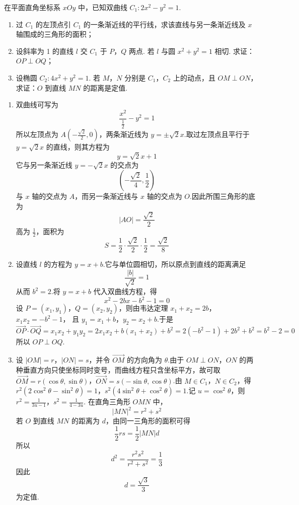 \begin{problem}
在平面直角坐标系 \(xOy\) 中，已知双曲线 \(C_1: 2x^2 - y^2 = 1\).

\begin{enumerate}
\item 过 \(C_{1}\) 的左顶点引 \(C_{1}\) 的一条渐近线的平行线，求该直线与另一条渐近线及 \(x\) 轴围成的三角形的面积；
\item 设斜率为 1 的直线 \(l\) 交 \(C_{1}\) 于 \(P\)，\(Q\) 两点. 若 \(l\) 与圆 \(x^{2} + y^{2} = 1\) 相切. 求证： \(OP \perp OQ\)；
\item 设椭圆 \(C_{2}: 4x^{2} + y^{2} = 1\). 若 \(M\)，\(N\) 分别是 \(C_{1}\)，\(C_{2}\) 上的动点，且 \(OM \perp ON\)，求证：\(O\) 到直线 \(MN\) 的距离是定值.
\end{enumerate}
\end{problem}

\begin{solution}
\begin{enumerate}
\item 双曲线可写为
\[
\frac{x^2}{\frac{1}{2}}-y^2=1
\]
所以左顶点为 \(A\left(-\frac{\sqrt2}{2},0\right)\)，两条渐近线为 \(y=\pm\sqrt2x\).取过左顶点且平行于 \(y=\sqrt2x\) 的直线，则其方程为
\[
y=\sqrt2x+1
\]
它与另一条渐近线 \(y=-\sqrt2x\) 的交点为
\[
\left(-\frac{\sqrt2}{4},\frac12\right)
\]
与 \(x\) 轴的交点为 \(A\)，而另一条渐近线与 \(x\) 轴的交点为 \(O\).因此所围三角形的底为
\[
|AO|=\frac{\sqrt2}{2}
\]
高为 \(\frac12\)，面积为
\[
S=\frac12\cdot\frac{\sqrt2}{2}\cdot\frac12=\frac{\sqrt2}{8}
\]

\item 设直线 \(l\) 的方程为 \(y=x+b\).它与单位圆相切，所以原点到直线的距离满足
\[
\frac{|b|}{\sqrt2}=1
\]
从而 \(b^2=2\).将 \(y=x+b\) 代入双曲线方程，得
\[
x^2-2bx-b^2-1=0
\]
设 \(P=(x_1,y_1)\)，\(Q=(x_2,y_2)\)，则由韦达定理 \(x_1+x_2=2b\)，\(x_1x_2=-b^2-1\)，
且 \(y_1=x_1+b\)，\(y_2=x_2+b\).于是
\[
\overrightarrow{OP}\cdot\overrightarrow{OQ}
=x_1x_2+y_1y_2
=2x_1x_2+b(x_1+x_2)+b^2
=2(-b^2-1)+2b^2+b^2
=b^2-2=0
\]
所以 \(OP\perp OQ\).

\item 设 \(|OM|=r\)，\(|ON|=s\)，并令 \(\overrightarrow{OM}\) 的方向角为 \(\theta\).由于 \(OM\perp ON\)，\(ON\) 的两种垂直方向只使坐标同时变号，而曲线方程只含坐标平方，故可取 \(\overrightarrow{OM}=r(\cos\theta,\sin\theta)\)，\(\overrightarrow{ON}=s(-\sin\theta,\cos\theta)\).由 \(M\in C_1\)，\(N\in C_2\)，得 \(r^2(2\cos^2\theta-\sin^2\theta)=1\)，\(s^2(4\sin^2\theta+\cos^2\theta)=1\).记 \(u=\cos^2\theta\)，则 \(r^2=\frac1{3u-1}\)，\(s^2=\frac1{4-3u}\).
在直角三角形 \(OMN\) 中，
\[
|MN|^2=r^2+s^2
\]
若 \(O\) 到直线 \(MN\) 的距离为 \(d\)，由同一三角形的面积可得
\[
\frac12rs=\frac12|MN|d
\]
所以
\[
d^2=\frac{r^2s^2}{r^2+s^2}
=\frac13
\]
因此
\[
d=\frac{\sqrt3}{3}
\]
为定值.
\end{enumerate}
\end{solution}

